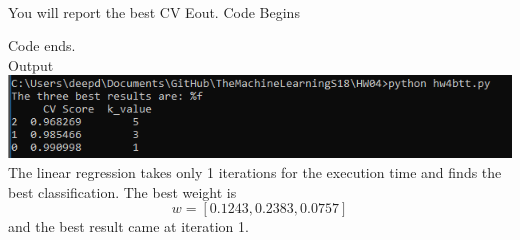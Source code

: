 \documentclass[10pt]{article}         %
\begin{document}
\\You will report the best CV Eout.
Code Begins

Code ends. 
\\Output\\
\includegraphics[scale=0.45]{hw4q1partc}
\\The linear regression takes only 1 iterations for the execution time and finds the best classification. The best weight is $$w = [0.1243,  0.2383, 0.0757]$$ and the best result came at iteration 1.
\end{document}
